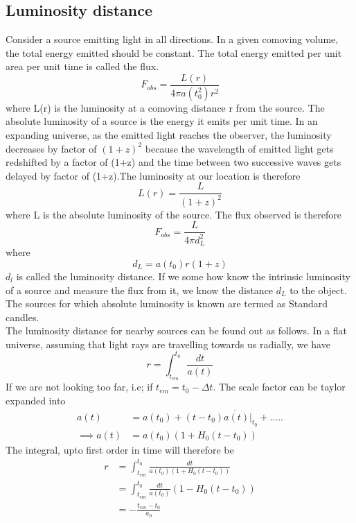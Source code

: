 \documentclass[12pt,a4paper,oneside]{book}
\begin{document}
\subsection{Luminosity distance}
Consider a source emitting light in all directions. In a given comoving volume, the total energy emitted should be constant. The total energy emitted per unit area per unit time is called the flux.  
\begin{equation}
    F_{obs} = \frac{L(r)}{4\pi a(t_{0}^2)r^2}
\end{equation}
where L(r) is the luminosity at a comoving distance r from the source. The absolute luminosity of a source is the energy it emits per unit time. In an expanding universe, as the emitted light reaches the observer, the luminosity decreases by factor of $(1+z)^2$ because the wavelength of emitted light gets redshifted by a factor of (1+z) and the time between two successive waves gets delayed by factor of (1+z).The luminosity at our location is therefore
\begin{equation}
L(r) = \frac{L}{(1+z)^2}    
\end{equation}
where L is the absolute luminosity of the source. The flux observed is therefore 
\begin{equation}
    F_{obs} = \frac{L}{4\pi d_{L}^2}
\end{equation}
where 
\begin{equation}
    d_{L} = a(t_{0})r(1+z)
\end{equation}
$d_{l}$ is called the luminosity distance. If we some how know the intrinsic luminosity of a source and measure the flux from it, we know the distance $d_{L}$ to the object. The sources for which absolute luminosity is known are termed as Standard candles.
\\ The luminosity distance for nearby sources can be found out as follows. In a flat universe, assuming that light rays are travelling towards us radially, we have
\begin{equation}
    r = \int_{t_{em}}^{t_{0}}\frac{dt}{a(t)} 
\end{equation}
If we are not looking too far, i.e; if $t_{em} = t_{0} - \Delta t $. The scale factor can be taylor expanded into
\begin{align}
    a(t)  &= a(t_{0}) + (t-t_{0}) \Dot{a(t)}|_{t_{0}} + .....\nonumber\\
   \implies a(t) &=  a(t_{0})(1+ H_{0}(t-t_{0}))
\end{align}
The integral, upto first order in time will therefore be 
\begin{align}
    r  &= \int_{t_{em}}^{t_{0}}\frac{dt}{a(t_{0})(1+H_{0}(t-t_{0}))}\nonumber\\
      &= \int_{t_{em}}^{t_{0}}\frac{dt}{a(t_{0})}(1-H_{0}(t-t_{0}))\nonumber\\
      &= -\frac{t_{em}-t_{0}}{a_{0}}
\end{align}
\end{document}

